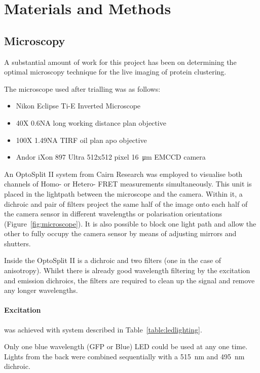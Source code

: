 \documentclass[../main.tex]{subfiles}
\begin{document}
\section{Materials and Methods}

\subsection{Microscopy}

A substantial amount of work for this project has been on determining the optimal microscopy technique for the live imaging of protein clustering.

The microscope used after trialling was as follows:

\begin{itemize}
\item{Nikon Eclipse Ti-E Inverted Microscope}
\item{40X 0.6NA long working distance plan objective}
\item{100X 1.49NA TIRF oil plan apo objective}
\item{Andor iXon 897 Ultra 512x512 pixel \SI{16}{\micro\meter} EMCCD camera}
\end{itemize}

An OptoSplit II system from Cairn Research was employed to visualise both channels of Homo- or Hetero- FRET measurements simultaneously. This unit is placed in the lightpath between the microscope and the camera. Within it, a dichroic and pair of filters project the same half of the image onto each half of the camera sensor in different wavelengths or polarisation orientations (Figure~\ref{fig:microscope}). It is also possible to block one light path and allow the other to fully occupy the camera sensor by means of adjusting mirrors and shutters.

Inside the OptoSplit II is a dichroic and two filters (one in the case of anisotropy). Whilst there is already good wavelength filtering by the excitation and emission dichroics, the filters are required to clean up the signal and remove any longer wavelengths.

\paragraph{Excitation} was achieved with system described in Table~\ref{table:ledlighting}.

Only one blue wavelength (GFP or Blue) LED could be used at any one time. Lights from the back were combined sequentially with a \SI{515}{\nano\meter} and \SI{495}{\nano\meter} dichroic.
\end{document}
